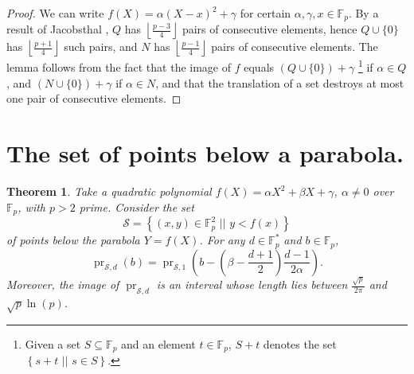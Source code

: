 \documentclass[a4paper, 12pt]{article}
\newtheorem{thm}{Theorem}[section]
\theoremstyle{definition}
\newcommand{\FF}{\mathbb F}
\newcommand{\sett}[2]{ \left\{ #1 \, \, || \, \, #2 \right \} }
\newcommand{\floor}[1]{\left \lfloor #1 \right \rfloor}
\newcommand{\ms}{\mathcal S}
\DeclareMathOperator{\pr}{pr}
\begin{document}
\begin{proof}
 We can write $f(X) = \alpha (X-x)^2 + \gamma$ for certain $\alpha, \gamma, x \in \FF_p$.
 By a result of Jacobsthal \cite{Jacobsthal:06}, $Q$ has $\floor{\frac{p-3}4}$ pairs of consecutive elements, hence $Q \cup \{0\}$ has $\floor{\frac{p+1}4}$ such pairs, and $N$ has $\floor{\frac{p-1}4}$ pairs of consecutive elements.
 The lemma follows from the fact that the image of $f$ equals $(Q \cup \{0\}) + \gamma$ \footnote{Given a set $S \subseteq \FF_p$ and an element $t \in \FF_p$, $S + t$ denotes the set $\sett{s+t}{s \in S}$.} if $\alpha \in Q$, and $(N \cup \{0\}) + \gamma$ if $\alpha \in N$, and that the translation of a set destroys at most one pair of consecutive elements.
\end{proof}

\section{The set of points below a parabola.}

\begin{thm}
 \label{Thm:Parabola}
 Take a quadratic polynomial $f(X) = \alpha X^2 + \beta X + \gamma$, $\alpha \neq 0$ over $\FF_p$, with $p > 2$ prime.
 Consider the set
 \[
  \ms = \sett{(x,y) \in \FF_p^2}{ y < f(x)}
 \]
 of points below the parabola $Y = f(X)$.
 For any $d \in \FF_p^*$ and $b \in \FF_p$,
 \[
  \pr_{\ms,d}(b) = \pr_{\ms,1}\left( b - \left(\beta-\frac{d+1}2\right)\frac{d-1}{2\alpha} \right).
 \]
 Moreover, the image of $\pr_{\ms,d}$ is an interval whose length lies between $\frac{\sqrt p}{2 \pi}$ and $\sqrt p \ln(p)$.
\end{thm}
\end{document}
